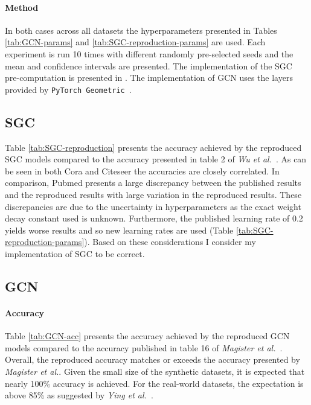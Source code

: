 \paragraph{Method}
In both cases across all datasets the hyperparameters presented in Tables \ref{tab:GCN-params} and \ref{tab:SGC-reproduction-params} are used.
Each experiment is run 10 times with different randomly pre-selected seeds and the mean and confidence intervals are presented.
The implementation of the SGC pre-computation is presented in .
The implementation of GCN uses the layers provided by \texttt{PyTorch Geometric}~\cite{Fey/Lenssen/2019}.

\subsection{SGC}


Table \ref{tab:SGC-reproduction} presents the accuracy achieved by the reproduced SGC models compared to the accuracy presented in table 2 of \textit{Wu et al.}~\cite{wu2019simplifying}.
As can be seen in both Cora and Citeseer the accuracies are closely correlated.
In comparison, Pubmed presents a large discrepancy between the published results and the reproduced results with large variation in the reproduced results.
These discrepancies are due to the uncertainty in hyperparameters as the exact weight decay constant used is unknown.
Furthermore, the published learning rate of 0.2 yields worse results and so new learning rates are used (Table \ref{tab:SGC-reproduction-params}).
Based on these considerations I consider my implementation of SGC to be correct.

\subsection{GCN}
\label{sec:GCN-reproduction}
\paragraph{Accuracy}

Table \ref{tab:GCN-acc} presents the accuracy achieved by the reproduced GCN models compared to the accuracy published in table 16 of \textit{Magister et al.}~\cite{magister2021gcexplainer}.
Overall, the reproduced accuracy matches or exceeds the accuracy presented by \textit{Magister et al.}.
Given the small size of the synthetic datasets, it is expected that nearly 100\% accuracy is achieved.
For the real-world datasets, the expectation is above 85\% as suggested by \textit{Ying et al.}~\cite{ying2019gnnexplainer}.

